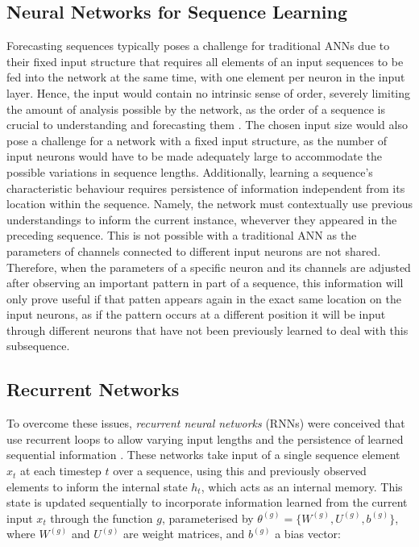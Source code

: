 \documentclass[a4paper, 11pt]{report}
\begin{document}
    \subsection{Neural Networks for Sequence Learning}

    Forecasting sequences typically poses a challenge for traditional ANNs due to their fixed input structure that requires all elements of an input sequences to be fed into the network at the same time, with one element per neuron in the input layer. Hence, the input would contain no intrinsic sense of order, severely limiting the amount of analysis possible by the network, as the order of a sequence is crucial to understanding and forecasting them \citep{tsantekidis-2022}. The chosen input size would also pose a challenge for a network with a fixed input structure, as the number of input neurons would have to be made adequately large to accommodate the possible variations in sequence lengths. Additionally, learning a sequence's characteristic behaviour requires persistence of information independent from its location within the sequence. Namely, the network must contextually use previous understandings to inform the current instance, wheverver they appeared in the preceding sequence. This is not possible with a traditional ANN as the parameters of channels connected to different input neurons are not shared. Therefore, when the parameters of a specific neuron and its channels are adjusted after observing an important pattern in part of a sequence, this information will only prove useful if that patten appears again in the exact same location on the input neurons, as if the pattern occurs at a different position it will be input through different neurons that have not been previously learned to deal with this subsequence.


    \subsection{Recurrent Networks}

    To overcome these issues, \emph{recurrent neural networks} (RNNs) were conceived that use recurrent loops to allow varying input lengths and the persistence of learned sequential information \citep{sharma-2022}. These networks take input of a single sequence element $x_t$ at each timestep $t$ over a sequence, using this and previously observed elements to inform the internal state $h_t$, which acts as an internal memory. This state is updated sequentially to incorporate information learned from the current input $x_t$ through the function $g$, parameterised by $\theta^{(g)} = \{ W^{(g)}, U^{(g)}, b^{(g)} \}$, where $W^{(g)}$ and $U^{(g)}$ are weight matrices, and $b^{(g)}$ a bias vector\citep{sharma-2022}:
\end{document}
